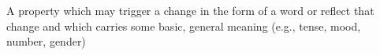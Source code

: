 A property which may trigger a change in the form of a word or reflect that change and which carries some basic, general meaning (e.g., tense, mood, number, gender)
